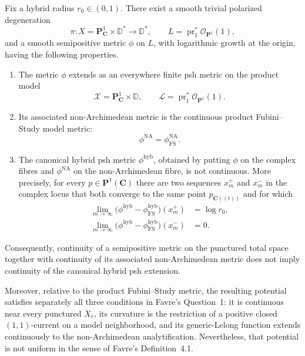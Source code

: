 \begin{theorem}
Fix a hybrid radius \(r_0\in(0,1)\).  There exist a smooth trivial
polarized degeneration
\[
 \pi\colon X=\mathbf P^1_{\mathbf C}\times\mathbb D^*
       \longrightarrow\mathbb D^*,
 \qquad
 L=\operatorname{pr}_1^*\mathcal O_{\mathbf P^1}(1),
\]
and a smooth semipositive metric \(\phi\) on \(L\), with logarithmic
growth at the origin, having the following properties.
\begin{enumerate}
\item The metric \(\phi\) extends as an everywhere finite psh metric on
the product model
\[
 \mathcal X=\mathbf P^1_{\mathbf C}\times\mathbb D,
 \qquad
 \mathcal L=\operatorname{pr}_1^*\mathcal O_{\mathbf P^1}(1).
\]
\item Its associated non-Archimedean metric is the continuous product
Fubini--Study model metric:
\[
                   \phi^{\mathrm{NA}}
                   =\phi_{\mathrm{FS}}^{\mathrm{NA}}.
\]
\item The canonical hybrid psh metric \(\phi^{\mathrm{hyb}}\), obtained
by putting \(\phi\) on the complex fibres and
\(\phi^{\mathrm{NA}}\) on the non-Archimedean fibre, is not continuous.
More precisely, for every \(p\in\mathbf P^1(\mathbf C)\) there are two
sequences \(x_m^+\) and \(x_m^-\) in the complex locus that both
converge to the same point \(p_{\mathbf C((t))}\) and for which
\[
\begin{aligned}
 \lim_{m\to\infty}
 \bigl(\phi^{\mathrm{hyb}}
       -\phi_{\mathrm{FS}}^{\mathrm{hyb}}\bigr)(x_m^+)
   &=\log r_0,\\
 \lim_{m\to\infty}
 \bigl(\phi^{\mathrm{hyb}}
       -\phi_{\mathrm{FS}}^{\mathrm{hyb}}\bigr)(x_m^-)
   &=0.
\end{aligned}
\]
\end{enumerate}
Consequently, continuity of a semipositive metric on the punctured total
space together with continuity of its associated non-Archimedean metric
does not imply continuity of the canonical hybrid psh extension.

Moreover, relative to the product Fubini--Study metric, the resulting
potential satisfies separately all three conditions in Favre's
Question~1: it is continuous near every punctured
\(\overline X_r\), its curvature is the restriction of a positive
closed \((1,1)\)-current on a model neighborhood, and its
generic-Lelong function extends continuously to the non-Archimedean
analytification.  Nevertheless, that potential is not uniform in the
sense of Favre's Definition~4.1.
\end{theorem}

